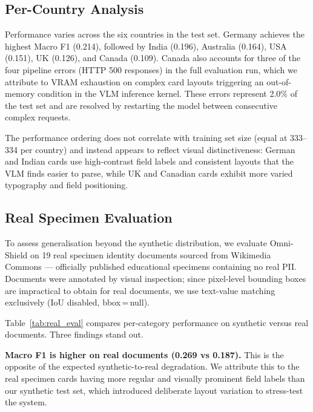 \subsection{Per-Country Analysis}

Performance varies across the six countries in the
test set.
Germany achieves the highest Macro F1 (0.214),
followed by India (0.196), Australia (0.164), USA
(0.151), UK (0.126), and Canada (0.109).
Canada also accounts for three of the four pipeline
errors (HTTP 500 responses) in the full evaluation
run, which we attribute to VRAM exhaustion on
complex card layouts triggering an out-of-memory
condition in the VLM inference kernel.
These errors represent 2.0\% of the test set and
are resolved by restarting the model between
consecutive complex requests.

The performance ordering does not correlate with
training set size (equal at 333--334 per country)
and instead appears to reflect visual distinctiveness:
German and Indian cards use high-contrast field
labels and consistent layouts that the VLM finds
easier to parse, while UK and Canadian cards exhibit
more varied typography and field positioning.

\subsection{Real Specimen Evaluation}
\label{sec:real_eval}

To assess generalisation beyond the synthetic
distribution, we evaluate Omni-Shield on 19 real
specimen identity documents sourced from Wikimedia
Commons --- officially published educational
specimens containing no real PII.
Documents were annotated by visual inspection;
since pixel-level bounding boxes are impractical
to obtain for real documents, we use text-value
matching exclusively (IoU disabled, bbox\,=\,null).



Table~\ref{tab:real_eval} compares per-category
performance on synthetic versus real documents.
Three findings stand out.

\textbf{Macro F1 is higher on real documents
(0.269 vs 0.187).}
This is the opposite of the expected synthetic-to-real
degradation.
We attribute this to the real specimen cards having
more regular and visually prominent field labels
than our synthetic test set, which introduced
deliberate layout variation to stress-test the system.

